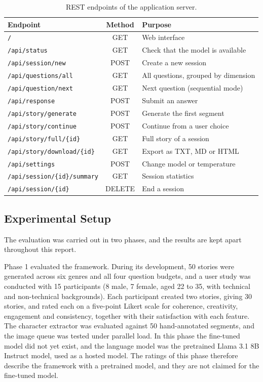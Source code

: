 \begin{table}[H]
\centering
\caption{REST endpoints of the application server.}
\label{tab:rest}
\renewcommand{\arraystretch}{1.15}
\small
\begin{tabular}{@{}lcl@{}}
\toprule
\textbf{Endpoint} & \textbf{Method} & \textbf{Purpose} \\
\midrule
\texttt{/}                           & GET    & Web interface \\
\texttt{/api/status}                 & GET    & Check that the model is available \\
\texttt{/api/session/new}            & POST   & Create a new session \\
\texttt{/api/questions/all}          & GET    & All questions, grouped by dimension \\
\texttt{/api/question/next}          & GET    & Next question (sequential mode) \\
\texttt{/api/response}               & POST   & Submit an answer \\
\texttt{/api/story/generate}         & POST   & Generate the first segment \\
\texttt{/api/story/continue}         & POST   & Continue from a user choice \\
\texttt{/api/story/full/\{id\}}      & GET    & Full story of a session \\
\texttt{/api/story/download/\{id\}}  & GET    & Export as TXT, MD or HTML \\
\texttt{/api/settings}               & POST   & Change model or temperature \\
\texttt{/api/session/\{id\}/summary} & GET    & Session statistics \\
\texttt{/api/session/\{id\}}         & DELETE & End a session \\
\bottomrule
\end{tabular}
\end{table}

\subsection{Experimental Setup}
\label{sec:model-setup}

The evaluation was carried out in two phases, and the results are kept apart throughout this report.

Phase 1 evaluated the framework. During its development, 50 stories were generated across six genres and all four question budgets, and a user study was conducted with 15 participants (8 male, 7 female, aged 22 to 35, with technical and non-technical backgrounds). Each participant created two stories, giving 30 stories, and rated each on a five-point Likert scale for coherence, creativity, engagement and consistency, together with their satisfaction with each feature. The character extractor was evaluated against 50 hand-annotated segments, and the image queue was tested under parallel load. In this phase the fine-tuned model did not yet exist, and the language model was the pretrained Llama 3.1 8B Instruct model, used as a hosted model. The ratings of this phase therefore describe the framework with a pretrained model, and they are not claimed for the fine-tuned model.

